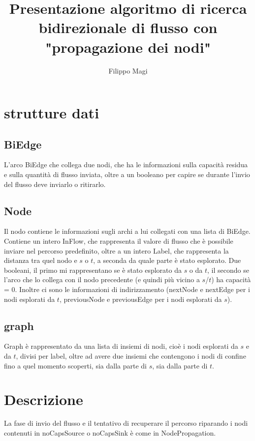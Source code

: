 \documentclass{article}
\title{Presentazione algoritmo di ricerca bidirezionale di flusso con "propagazione dei nodi"}
\author{Filippo Magi }
\begin{document}
\maketitle

\section{strutture dati}
\subsection{BiEdge}

L'arco BiEdge che collega due nodi, che ha le informazioni sulla capacità residua e sulla quantità di flusso inviata, oltre a un booleano per capire se durante l'invio del flusso deve inviarlo o ritirarlo.

\subsection{Node}

Il nodo contiene le informazioni sugli archi a lui collegati con una lista di BiEdge.
Contiene un intero InFlow, che rappresenta il valore di flusso che è possibile inviare nel percorso predefinito, oltre a un intero Label, che rappresenta la distanza tra quel nodo e $s$ o $t$, a seconda da quale parte è stato esplorato.
Due booleani, il primo mi rappresentano se è stato esplorato da $s$ o da $t$, il secondo se l'arco che lo collega con il nodo precedente (e quindi più vicino a $s$/$t$) ha capacità =  0.
Inoltre ci sono le informazioni di indirizzamento (nextNode e nextEdge per i nodi esplorati da $t$, previousNode e previousEdge per i nodi esplorati da $s$).
\subsection{graph}
Graph è rappresentato da una lista di insiemi di nodi, cioè i nodi esplorati da $s$ e da $t$, divisi per label, oltre ad avere due insiemi che contengono i nodi di confine fino a quel momento scoperti, sia dalla parte di $s$, sia dalla parte di $t$.

\section{Descrizione}

La fase di invio del flusso e il tentativo di recuperare il percorso riparando i nodi contenuti in noCapsSource o noCapsSink è come in NodePropagation. %
\end{document}

